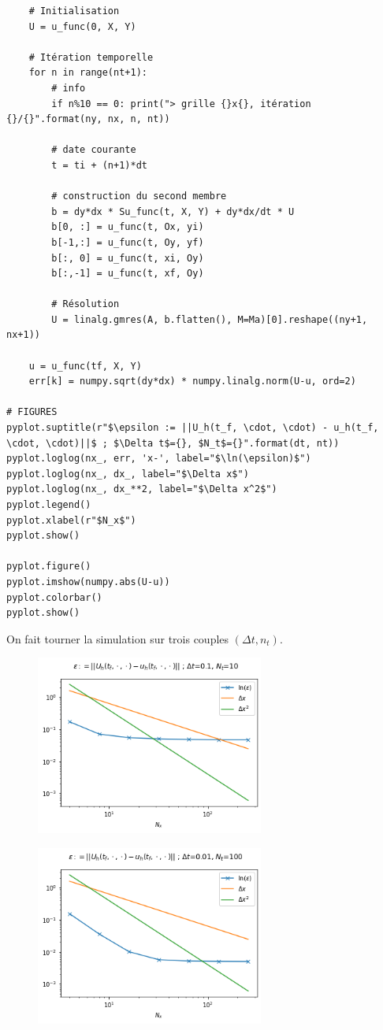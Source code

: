 \begin{verbatim}
    # Initialisation
    U = u_func(0, X, Y)
    
    # Itération temporelle
    for n in range(nt+1):
        # info
        if n%10 == 0: print("> grille {}x{}, itération {}/{}".format(ny, nx, n, nt))
        
        # date courante
        t = ti + (n+1)*dt
        
        # construction du second membre
        b = dy*dx * Su_func(t, X, Y) + dy*dx/dt * U
        b[0, :] = u_func(t, Ox, yi)
        b[-1,:] = u_func(t, Oy, yf)
        b[:, 0] = u_func(t, xi, Oy)
        b[:,-1] = u_func(t, xf, Oy)
        
        # Résolution
        U = linalg.gmres(A, b.flatten(), M=Ma)[0].reshape((ny+1, nx+1))
        
    u = u_func(tf, X, Y)    
    err[k] = numpy.sqrt(dy*dx) * numpy.linalg.norm(U-u, ord=2)

# FIGURES
pyplot.suptitle(r"$\epsilon := ||U_h(t_f, \cdot, \cdot) - u_h(t_f, \cdot, \cdot)||$ ; $\Delta t$={}, $N_t$={}".format(dt, nt))
pyplot.loglog(nx_, err, 'x-', label="$\ln(\epsilon)$")
pyplot.loglog(nx_, dx_, label="$\Delta x$")
pyplot.loglog(nx_, dx_**2, label="$\Delta x^2$")
pyplot.legend()
pyplot.xlabel(r"$N_x$")
pyplot.show()

pyplot.figure()
pyplot.imshow(numpy.abs(U-u))
pyplot.colorbar()
pyplot.show()
\end{verbatim}
On fait tourner la simulation sur trois couples $(\Delta t, n_t)$.

\begin{figure}[htp]
    \centering
    \includegraphics[width=7.5cm]{Images/stokes/Parbolique 2D/analyse 1.png}
    \caption{}
\end{figure}

\begin{figure}[htp]
    \centering
    \includegraphics[width=7.5cm]{Images/stokes/Parbolique 2D/analyse 2.png}
    \caption{}
\end{figure}

